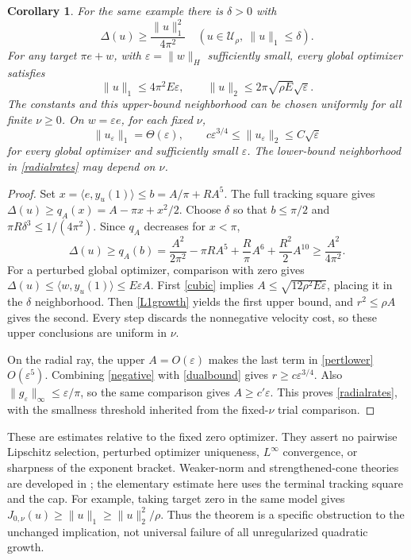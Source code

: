 \documentclass[11pt]{article}
\newtheorem{corollary}[theorem]{Corollary}
\newcommand{\U}{\mathcal U_\rho}
\newcommand{\norm}[1]{\lVert #1\rVert}
\newcommand{\ip}[2]{\langle #1,#2\rangle}
\begin{document}
\begin{corollary}\label{weaker}
For the same example there is $\delta>0$ with
\begin{equation}\label{L1growth}
 \Delta(u)\ge\frac{\norm u_1^2}{4\pi^2}
 \quad (u\in\U,\ \norm u_1\le\delta).
\end{equation}
For any target $\pi e+w$, with $\varepsilon=\norm w_H$ sufficiently small,
every global optimizer satisfies
\begin{equation}\label{upperrates}
 \norm u_1\le4\pi^2E\varepsilon,\qquad
 \norm u_2\le2\pi\sqrt{\rho E}\sqrt\varepsilon.
\end{equation}
The constants and this upper-bound neighborhood can be chosen uniformly
for all finite $\nu\ge0$. On $w=\varepsilon e$, for each fixed $\nu$,
\begin{equation}\label{radialrates}
 \norm{u_\varepsilon}_1=\Theta(\varepsilon),\qquad
 c\varepsilon^{3/4}\le\norm{u_\varepsilon}_2\le C\sqrt\varepsilon
\end{equation}
for every global optimizer and sufficiently small $\varepsilon$.
The lower-bound neighborhood in \eqref{radialrates} may depend on $\nu$.
\end{corollary}
\begin{proof}
Set $x=\ip e{y_u(1)}\le b=A/\pi+RA^5$. The full tracking square gives
$\Delta(u)\ge q_A(x)=A-\pi x+x^2/2$. Choose $\delta$ so that $b\le\pi/2$
and $\pi R\delta^3\le1/(4\pi^2)$. Since $q_A$ decreases for $x<\pi$,
\[
 \Delta(u)\ge q_A(b)
 =\frac{A^2}{2\pi^2}-\pi RA^5+\frac R\pi A^6+\frac{R^2}2A^{10}
 \ge\frac{A^2}{4\pi^2}.
\]
For a perturbed global optimizer, comparison with zero gives
$\Delta(u)\le\ip w{y_u(1)}\le E\varepsilon A$. First \eqref{cubic}
implies $A\le\sqrt{12\rho^2E\varepsilon}$, placing it in the $\delta$
neighborhood. Then \eqref{L1growth} yields the first upper bound, and
$r^2\le\rho A$ gives the second. Every step discards the nonnegative
velocity cost, so these upper conclusions are uniform in $\nu$.

On the radial ray, the upper $A=O(\varepsilon)$ makes the last term in
\eqref{pertlower} $O(\varepsilon^5)$. Combining \eqref{negative} with
\eqref{dualbound} gives $r\ge c\varepsilon^{3/4}$. Also
$\norm{g_\varepsilon}_\infty\le\varepsilon/\pi$, so the same comparison
gives $A\ge c'\varepsilon$. This proves \eqref{radialrates}, with the
smallness threshold inherited from the fixed-$\nu$ trial comparison.
\end{proof}

These are estimates relative to the fixed zero optimizer. They assert no
pairwise Lipschitz selection, perturbed optimizer uniqueness,
$L^\infty$ convergence, or sharpness of the exponent bracket.
Weaker-norm and strengthened-cone theories are developed in
\cite{WW,CHW,CW,BW}; the elementary estimate here uses the terminal
tracking square and the cap. For example, taking target zero in the same
model gives $J_{0,\nu}(u)\ge\norm u_1\ge\norm u_2^2/\rho$.
Thus the theorem is a specific obstruction to the unchanged implication,
not universal failure of all unregularized quadratic growth.
\end{document}
